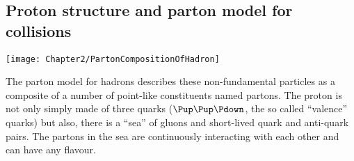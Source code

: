 

\subsection{Proton structure and parton model for collisions}
\label{sec:Chap2:PhenoOfPP:ProtonStructure}

\begin{minipage}{.45\textwidth}
 	\texttt{[image: Chapter2/PartonCompositionOfHadron]}
\end{minipage}\hfill
\begin{minipage}{.54\textwidth}
	The parton model for hadrons describes these non-fundamental particles as a composite of a number of point-like constituents named partons.
	The proton is not only simply made of three quarks ($\Pup \Pup \Pdown$, the so called ``valence'' quarks) but also, there is a ``sea'' of
	gluons and short-lived quark and anti-quark pairs. The partons in the sea are continuously interacting with each other and can have
	any flavour.
\end{minipage}




